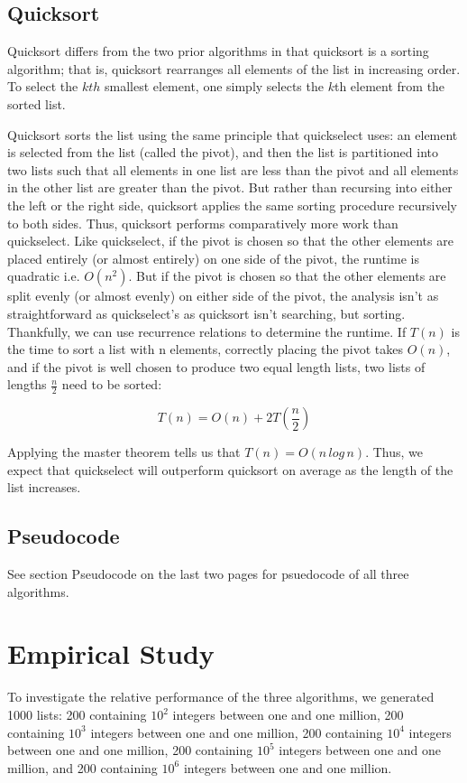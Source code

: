 \documentclass{article}
\begin{document}
\subsection*{Quicksort}
\indent \indent Quicksort differs from the two prior algorithms in that quicksort is a sorting algorithm; that is, quicksort rearranges all elements of the list in increasing order. To select the $kth$ smallest element, one simply selects the $k$th element from the sorted list.

Quicksort sorts the list using the same principle that quickselect uses: an element is selected from the list (called the pivot), and then the list is partitioned into two lists such that all elements in one list are less than the pivot and all elements in the other list are greater than the pivot. But rather than recursing into either the left or the right side, quicksort applies the same sorting procedure recursively to both sides. Thus, quicksort performs comparatively more work than quickselect. Like quickselect, if the pivot is chosen so that the other elements are placed entirely (or almost entirely) on one side of the pivot, the runtime is quadratic i.e. $O(n^2)$. But if the pivot is chosen so that the other elements are split evenly (or almost evenly) on either side of the pivot, the analysis isn't as straightforward as quickselect's as quicksort isn't searching, but sorting. Thankfully, we can use recurrence relations to determine the runtime. If $T(n)$ is the time to sort a list with n elements, correctly placing the pivot takes $O(n)$, and if the pivot is well chosen to produce two equal length lists, two lists of lengths $\frac{n}{2}$ need to be sorted:

$$T(n) = O(n) + 2 T(\frac{n}{2})$$

Applying the master theorem tells us that $T(n) = O(n \, log \, n)$. Thus, we expect that quickselect will outperform quicksort on average as the length of the list increases.

\subsection*{Pseudocode}
See section Pseudocode on the last two pages for psuedocode of all three algorithms.

\pagebreak

\section*{Empirical Study}
\indent \indent To investigate the relative performance of the three algorithms, we generated 1000 lists: 200 containing $10^2$ integers between one and one million, 200 containing $10^3$ integers between one and one million, 200 containing $10^4$ integers between one and one million, 200 containing $10^5$ integers between one and one million, and 200 containing $10^6$ integers between one and one million.
\end{document}
